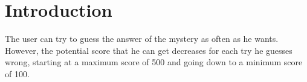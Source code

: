 \chapter{Introduction}

The user can try to guess the answer of the mystery as often as he wants. However, the potential score that he can get decreases for each try he guesses wrong, starting at a maximum score of 500 and going down to a minimum score of 100.